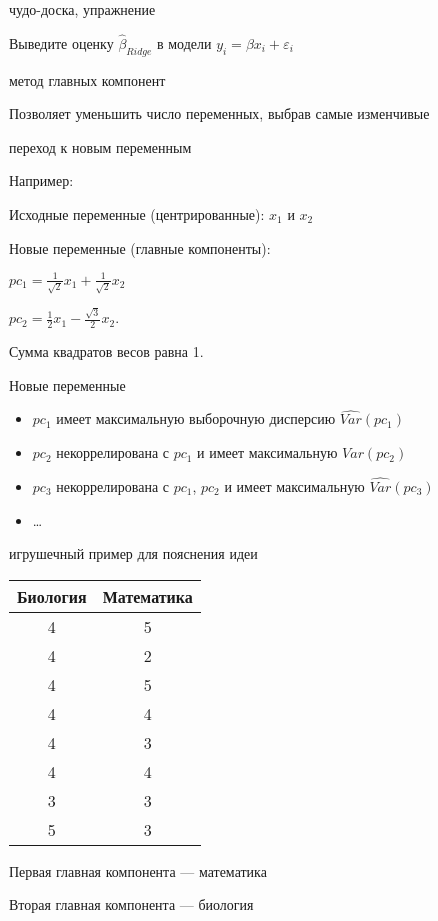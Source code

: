 \documentclass[ignorenonframetext,]{beamer}
\begin{document}
\begin{frame}{чудо-доска, упражнение}

Выведите оценку \(\hat{\beta}_{Ridge}\) в модели
\(y_i=\beta x_i + \varepsilon_i\)

\end{frame}

\begin{frame}{метод главных компонент}

Позволяет уменьшить число переменных, выбрав самые изменчивые

\end{frame}

\begin{frame}{переход к новым переменным}

Например:

Исходные переменные (центрированные): \(x_1\) и \(x_2\)

Новые переменные (главные компоненты):

\(pc_1=\frac{1}{\sqrt{2}}x_1+\frac{1}{\sqrt{2}}x_2\)

\(pc_2=\frac{1}{2}x_1-\frac{\sqrt{3}}{2}x_2\).

Сумма квадратов весов равна 1.

\end{frame}

\begin{frame}{Новые переменные}

\begin{itemize}
\itemsep1pt\parskip0pt
\item
  \(pc_1\) имеет максимальную выборочную дисперсию
  \(\widehat{Var}(pc_1)\)
\item
  \(pc_2\) некоррелирована с \(pc_1\) и имеет максимальную
  \(\widehat{Var}(pc_2)\)
\item
  \(pc_3\) некоррелирована с \(pc_1\), \(pc_2\) и имеет максимальную
  \(\widehat{Var}(pc_3)\)
\item
  \ldots{}
\end{itemize}

\end{frame}

\begin{frame}{игрушечный пример для пояснения идеи}

\begin{tabular}{cc}
Биология & Математика \\ 
\hline 
4 & 5 \\ 
4 & 2 \\ 
4 & 5 \\ 
4 & 4 \\ 
4 & 3 \\ 
4 & 4 \\ 
3 & 3 \\ 
5 & 3 \\ 
\end{tabular}

Первая главная компонента --- математика

Вторая главная компонента --- биология

\end{frame}
\end{document}
